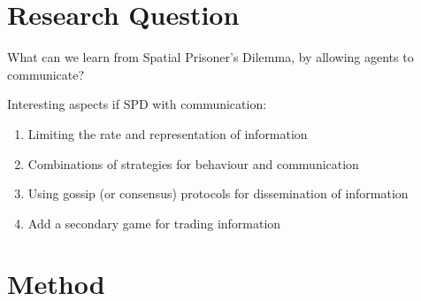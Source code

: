 \documentclass[english]{article}
\begin{document}
\section*{Research Question}


What can we learn from Spatial Prisoner’s Dilemma, by allowing agents to communicate?

Interesting aspects if SPD with communication:
\begin{enumerate}
\item Limiting the rate and representation of information
\item Combinations of strategies for behaviour and communication
\item Using gossip (or consensus) protocols for dissemination of information
\item Add a secondary game for trading information 
\end{enumerate}



\section*{Method}
\end{document}
